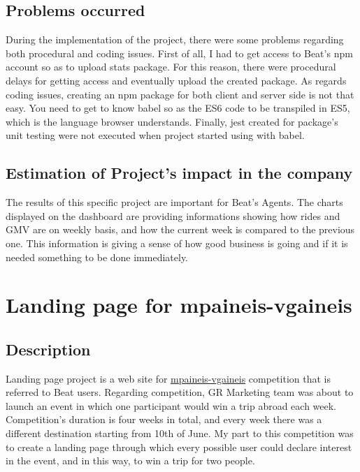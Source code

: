 \subsection{Problems occurred}

During the implementation of the project, there were some problems regarding both procedural and coding issues. First of all, I had to get access to Beat's npm account so as to upload stats package. For this reason, there were procedural delays for getting access and eventually upload the created package. As regards coding issues, creating an npm package for both client and server side is not that easy. You need to get to know babel so as the ES6 code to be transpiled in ES5, which is the language browser understands. Finally, jest created for package's unit testing were not executed when project started using with babel. \par

\subsection{Estimation of Project's impact in the company}

The results of this specific project are important for Beat's Agents. The charts displayed on the dashboard are providing informations showing how rides and GMV are on weekly basis, and how the current week is compared to the previous one. This information is giving a sense of how good business is going and if it is needed something to be done immediately.

\section{Landing page for mpaineis-vgaineis}

\subsection{Description}

Landing page project is a web site for \href{mpaineis-vgaineis.gr}{mpaineis-vgaineis} competition that is referred to Beat users. Regarding competition, GR Marketing team was about to launch an event in which one participant would win a trip abroad each week. Competition's duration is four weeks in total, and every week there was a different destination starting from 10th of June. My part to this competition was to create a landing page through which every possible user could declare interest in the event, and in this way, to win a trip for two people. \par

